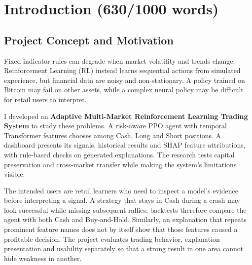 \documentclass[11pt,a4paper]{article}
\begin{document}
\newpage

{
  \hypersetup{linkcolor=black}
  \tableofcontents
  \vspace{1.5cm}
  \listoffigures
  \vspace{1.5cm}
  \listoftables
}

\newpage
{}


\section{Introduction (630/1000 words)}

\subsection{Project Concept and Motivation}
Fixed indicator rules can degrade when market volatility and trends change. Reinforcement Learning (RL) instead learns sequential actions from simulated experience, but financial data are noisy and non-stationary. A policy trained on Bitcoin may fail on other assets, while a complex neural policy may be difficult for retail users to interpret.

I developed an \textbf{Adaptive Multi-Market Reinforcement Learning Trading System} to study these problems. A risk-aware PPO agent with temporal Transformer features chooses among Cash, Long and Short positions. A dashboard presents its signals, historical results and SHAP feature attributions, with rule-based checks on generated explanations. The research tests capital preservation and cross-market transfer while making the system's limitations visible.

The intended users are retail learners who need to inspect a model's evidence before interpreting a signal. A strategy that stays in Cash during a crash may look successful while missing subsequent rallies; backtests therefore compare the agent with both Cash and Buy-and-Hold. Similarly, an explanation that repeats prominent feature names does not by itself show that those features caused a profitable decision. The project evaluates trading behavior, explanation presentation and usability separately so that a strong result in one area cannot hide weakness in another.
\end{document}
